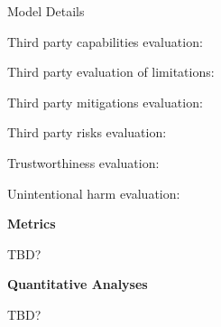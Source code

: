 \documentclass[12pt]{article}
\begin{document}
\begin{multicols*}{2}
\begin{sectionlist}{Model Details}
    \item Third party capabilities evaluation: 
    \item Third party evaluation of limitations: 
    \item Third party mitigations evaluation: 
    \item Third party risks evaluation: 
    \item Trustworthiness evaluation: 
    \item Unintentional harm evaluation: 
\end{sectionlist}



\textbf{Metrics}

TBD?







\textbf{Quantitative Analyses}

TBD?

\end{multicols*}
\end{document}

